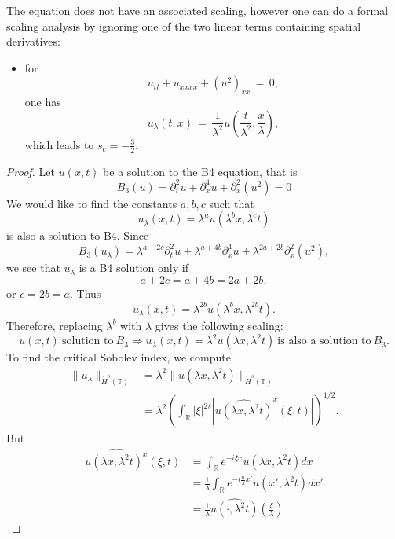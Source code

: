 \documentclass[12pt,reqno]{amsart}
\numberwithin{equation}{section}  %
\newcommand{\rr}{\mathbb{R}}
\newcommand{\ci}{\mathbb{T}}
\newcommand{\wh}{\widehat}
\begin{document}
The equation does not have an associated scaling, however one can do a formal scaling analysis by ignoring one of the two linear terms containing spatial derivatives:
\begin{itemize}
  \item for 
    \[
    u_{tt}+u_{xxxx}+(u^2)_{xx}\,=\,0,
    \]
    one has 
    \[
    u_{\lambda}(t,x)\,=\,\frac{1}{\lambda^2}u\left(\frac{t}{\lambda^2}, \frac{x}{\lambda}\right),
    \]
    which leads to $s_c=-\frac 32$.
\end{itemize}
\begin{proof}
Let $u(x, t)$ be a solution to the B4 equation, that is
%
$$
B_3(u)=
 \partial_t^2u + \partial^4_x u + \partial_x^2(u^2)  = 0
$$
%
We would like to find the constants
$a, b, c$ such that
\[
u_\lambda (x, t) = \lambda^a u(\lambda^b x, \lambda^c t)
\]
is also a solution to B4.  Since 
$$
B_3(u_\lambda)=
\lambda^{a+2c} \partial_t^2u 
+
 \lambda^{a+4b} \partial^4_x u 
 +
  \lambda^{2a+2b}
  \partial_x^2(u^2),  
$$
we see that $u_\lambda$ is a B4 solution only if
$$
a+2c=a+4b=2a+2b,
$$
or
$
c= 2b =a.
$
  Thus
\[
u_\lambda (x, t) = \lambda^{2b} u(\lambda^{b}x,  \lambda^{2b} t).
\]
%
%
Therefore, replacing  $\lambda^b$ with  $ \lambda$ gives the following scaling:
%
\begin{equation}
\label{DP-scal}
\boxed{u(x, t) \ \text{solution to} \  B_3
 \Longrightarrow 
u_\lambda (x, t) = \lambda^2 u(\lambda x, \lambda^2 t)  \ \text{is also a
solution to} \  B_3.}
\end{equation}
\label{rem:scaling}
To find the critical Sobolev index, we compute
%
%
\begin{equation}
\begin{split}
  \| u_{\lambda} \|_{\dot{H}^s(\ci)} 
  & = \lambda^{2} \| u(\lambda x, \lambda^2 t) \|_{\dot{H}^{s}(\ci)}
  \\
  & = \lambda^{2} \left( \int_{\rr} | \xi |^{2s} | \wh{u (\lambda x,
  \lambda^{2} t)}^x (\xi, t)| \right)^{1/2}.
\end{split}
\label{crit-ind-comp}
\end{equation}
%
But
%
%
\begin{equation*}
\begin{split}
  \wh{u(\lambda x, \lambda^{2}t)^x}(\xi, t)
  & = \int_{\rr}e^{-i\xi x}u(\lambda x, \lambda^2 t) dx
  \\
  & = \frac{1}{\lambda} \int_{\rr}e^{-i \frac{n}{\lambda} x'}u(x',
  \lambda^{2} t) dx'
  \\
  & = \frac{1}{\lambda} \wh{u(\cdot, \lambda^{2}t)}(\frac{\xi}{\lambda})

\end{split}
\end{equation*}
\end{proof}
\end{document}
